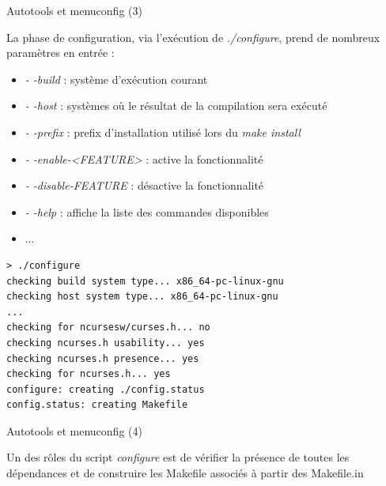 \documentclass[12pt, t]{beamer}
\newcommand{\bi}{\begin{itemize}}
\newcommand{\ei}{\end{itemize}}
\begin{document}
\begin{frame}{Autotools et menuconfig (3)}

    \vspace{10pt}
    La phase de configuration, via l'exécution de {\textit{./configure}},
    prend de nombreux paramètres en entrée :
    \vspace{5pt}
    \bi
    \itemsep8pt
    \item {\textit{- -build}} : système d'exécution courant
    \item {\textit{- -host}} : systèmes où le résultat de la compilation
          sera exécuté
    \item {\textit{- -prefix}} : prefix d'installation utilisé lors du
          {\textit{make install}}
    \item {\textit{- -enable-<FEATURE>}} : active la fonctionnalité
    \item {\textit{- -disable-FEATURE}} : désactive la fonctionnalité
    \item {\textit{- -help}} : affiche la liste des commandes disponibles
    \item ...
    \ei
\end{frame}

{
    \begin{lstlisting}
> ./configure
checking build system type... x86_64-pc-linux-gnu
checking host system type... x86_64-pc-linux-gnu
...
checking for ncursesw/curses.h... no
checking ncurses.h usability... yes
checking ncurses.h presence... yes
checking for ncurses.h... yes
configure: creating ./config.status
config.status: creating Makefile
    \end{lstlisting}
}

\begin{frame}{Autotools et menuconfig (4)}

    \vspace{15pt}
    Un des rôles du script {\textit{configure}} est de vérifier la présence
    de toutes les dépendances et de construire les Makefile associés à partir
    des Makefile.in

    {
        \vspace{15pt}
        \lstconf
    }
\end{frame}
\end{document}
